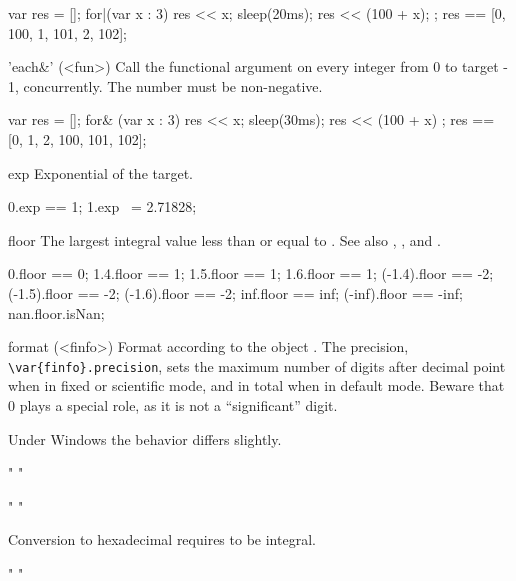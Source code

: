 \begin{urbiscriptapi}
\begin{urbiassert}
{
  var res = [];
  for|(var x : 3) { res << x; sleep(20ms); res << (100 + x); };
  res
}
== [0, 100, 1, 101, 2, 102];
\end{urbiassert}%

\item['each&'](<fun>)%
  Call the functional argument  on every integer from 0 to
  target - 1, concurrently.  The number must be non-negative.
\begin{urbiassert}
{
  var res = [];
  for& (var x : 3) { res << x; sleep(30ms); res << (100 + x) };
  res
}
== [0, 1, 2, 100, 101, 102];
\end{urbiassert}%

\item[exp]
  Exponential of the target.
\begin{urbiassert}
0.exp == 1;
1.exp ~= 2.71828;
\end{urbiassert}


\item[floor] The largest integral value less than or equal to \this.  See
  also , , and .
\begin{urbiassert}
     0.floor ==  0;
   1.4.floor ==  1;     1.5.floor ==  1;    1.6.floor ==  1;
(-1.4).floor == -2;  (-1.5).floor == -2; (-1.6).floor == -2;
   inf.floor == inf; (-inf).floor == -inf;
   nan.floor.isNan;
\end{urbiassert}


\item[format](<finfo>)%
  Format according to the  object .
  The precision, \lstinline|\var{finfo}.precision|, sets the maximum
  number of digits after decimal point when in fixed or scientific
  mode, and in total when in default mode.  Beware that 0 plays a
  special role, as it is not a ``significant'' digit.

  \begin{windows}
    Under Windows the behavior differs slightly.
  \end{windows}
\begin{urbiassert}
"%
"%

"%
"%
\end{urbiassert}

  Conversion to hexadecimal requires \this to be integral.
\begin{urbiassert}
"%
"%


\end{urbiassert}
\end{urbiscriptapi}
